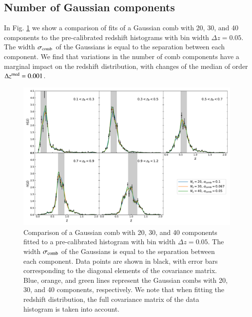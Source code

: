 \documentclass{aa}
\begin{document}
\begin{appendix}
\subsection{Number of Gaussian components}
In Fig. \ref{fig:n_comp} we show a comparison of fits of a Gaussian comb with 20, 30, and 40 components to the pre-calibrated redshift histograms with bin width $\Delta z = 0.05$.  The width $\sigma_{\rm comb}$ of the Gaussians is equal to the separation between each component. We find that variations in the number of comb components have a marginal impact on the redshift distribution, with changes of the median of order $\Delta z^{\rm med} = 0.001$.
\begin{figure}
\centering
\includegraphics[width=\linewidth]{calibration_bin_number.pdf}
\caption{Comparison of a Gaussian comb with 20, 30, and 40 components fitted to a pre-calibrated histogram with bin width $\Delta z = 0.05$. The width $\sigma_{\rm comb}$ of the Gaussians is equal to the separation between each component. Data points are shown in black, with error bars corresponding to the diagonal elements of the covariance matrix. Blue, orange, and green lines represent the Gaussian combs with 20, 30, and 40 components, respectively. We note that when fitting the redshift distribution, the full covariance matrix of the data histogram is taken into account.}
\label{fig:n_comp}
\end{figure}

\end{appendix}
\end{document}

